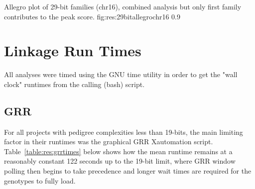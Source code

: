 	{Allegro plot of 29-bit families (chr16), combined analysis but only first family contributes to the peak score.}
	{fig:res:29bitallegrochr16}
	{0.9}{}


\section{Linkage Run Times}

All analyses were timed using the GNU time utility in order to get the "wall clock" runtimes from the calling (bash) script.

\subsection{GRR}
For all projects with pedigree complexities less than 19-bits, the main limiting factor in their runtimes was the graphical GRR Xautomation script. Table~\ref{table:res:grrtimes} below shows how the mean runtime  remains at a reasonably constant 122 seconds up to the 19-bit limit, where GRR window polling then begins to take precedence and longer wait times are required for the genotypes to fully load.

